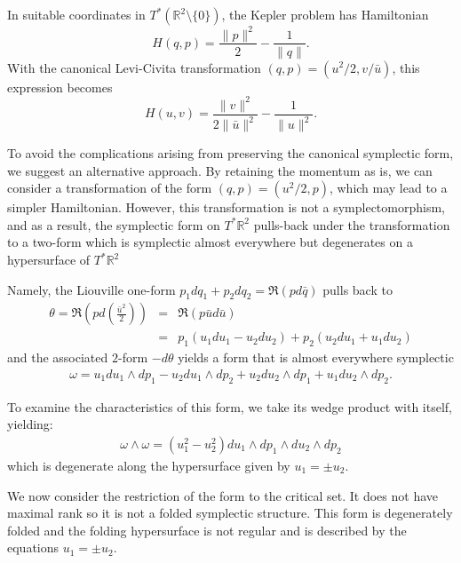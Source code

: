 In suitable coordinates in $T^*\left(\mathbb{R}^2\setminus\{0\}\right)$, the Kepler problem has Hamiltonian
\begin{equation}
 H(q,p)=\frac{\|p\|^2}{2}-\frac{1}{\|q\|}.
\end{equation}
With the canonical Levi-Civita transformation $(q,p) = (u^2/2, v/\bar{u})$, this expression becomes
\begin{equation}
 H(u,v)=\frac{\|v\|^2}{2\|\bar{u}\|^2}-\frac{1}{\|u\|^2}.
\end{equation}

 

To avoid the complications arising from preserving the canonical symplectic form, we suggest an alternative approach. By retaining the momentum as is, we can consider a transformation of the form $(q,p) = (u^2/2, p)$, which may lead to a simpler Hamiltonian. However, this transformation is not a symplectomorphism, and as a result, the symplectic form on $T^*\mathbb{R}^2$ pulls-back under the transformation to a two-form  which is symplectic almost everywhere but degenerates on a hypersurface of $T^*\mathbb{R}^2$


Namely, the Liouville one-form $p_1 dq_1+p_2 dq_2=\Re(p d\bar{q})$ pulls back to
\begin{eqnarray*}
    \theta=\Re\left(p d\left(\frac{\bar{u}^2}{2}\right)\right)&=&\Re\left(p \bar{u}d\bar{u}\right)\\
    &=&p_1(u_1du_1-u_2du_2)+p_2(u_2du_1+u_1du_2)
\end{eqnarray*}
and the associated $2$-form  $-d\theta$ yields a form that is almost everywhere symplectic 
\begin{eqnarray*}
   \omega=u_1du_1\wedge dp_1 - u_2 du_1 \wedge dp_2 + u_2 du_2 \wedge dp_1 + u_1 du_2\wedge dp_2.
\end{eqnarray*}

To examine the characteristics of this form, we take its wedge product with itself, yielding:
\begin{eqnarray*}
   \omega\wedge\omega=(u_1^2-u_2^2) du_1 \wedge dp_1 \wedge du_2\wedge dp_2
\end{eqnarray*}
which is degenerate along the hypersurface given by $u_1=\pm u_2$.

We now consider the restriction of the form to the critical set. It does not have maximal rank so it is not a folded symplectic structure.
This form is  degenerately folded and the folding hypersurface is not regular and is described by the equations $u_1=\pm u_2$.

